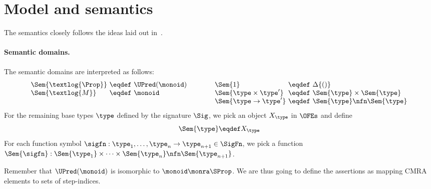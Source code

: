 \section{Model and semantics}
\label{sec:model}

The semantics closely follows the ideas laid out in~\cite{catlogic}.

\paragraph{Semantic domains.}

The semantic  domains are interpreted as follows:
\[
\begin{array}[t]{@{}l@{\ }c@{\ }l@{}}
\Sem{\textlog{\Prop}} &\eqdef& \UPred(\monoid)  \\
\Sem{\textlog{M}} &\eqdef& \monoid
\end{array}
\qquad\qquad
\begin{array}[t]{@{}l@{\ }c@{\ }l@{}}
\Sem{1} &\eqdef& \Delta \{ () \} \\
\Sem{\type \times \type'} &\eqdef& \Sem{\type} \times \Sem{\type} \\
\Sem{\type \to \type'} &\eqdef& \Sem{\type} \nfn \Sem{\type} \\
\end{array}
\]
For the remaining base types $\type$ defined by the signature $\Sig$, we pick an object $X_\type$ in $\OFEs$ and define
\[
\Sem{\type} \eqdef X_\type
\]
For each function symbol $\sigfn : \type_1, \dots, \type_n \to \type_{n+1} \in \SigFn$, we pick a function $\Sem{\sigfn} : \Sem{\type_1} \times \dots \times \Sem{\type_n} \nfn \Sem{\type_{n+1}}$.


Remember that $\UPred(\monoid)$ is isomorphic to $\monoid \monra \SProp$.
We are thus going to define the assertions as mapping CMRA elements to sets of step-indices.

